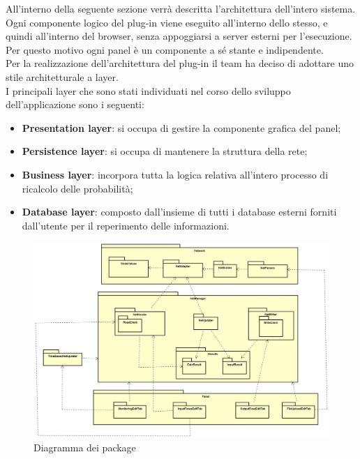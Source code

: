 \pagebreak
{}
All'interno della seguente sezione verrà descritta l'architettura dell'intero sistema.\\
Ogni componente logico del plug-in viene eseguito all'interno dello stesso, e quindi all'interno del browser, senza appoggiarsi a server esterni per l'esecuzione. Per questo motivo ogni panel è un componente a sé stante e indipendente. \\
Per la realizzazione dell'architettura del plug-in il team ha deciso di adottare uno stile architetturale a layer.\\
I principali layer che sono stati individuati nel corso dello sviluppo dell'applicazione sono i seguenti:
\begin{itemize}
	\item{\textbf{Presentation layer}: si occupa di gestire la componente grafica del panel;}
	\item{\textbf{Persistence layer}: si occupa di mantenere la struttura della rete;}
	\item{\textbf{Business layer}: incorpora tutta la logica relativa all’intero processo di ricalcolo delle probabilità;}
	\item{\textbf{Database layer}: composto dall’insieme di tutti i database esterni forniti dall’utente per il reperimento delle informazioni.}
\end{itemize}
\begin{figure} [H]
	\centerline{
	\includegraphics[scale=0.3]{Img/Diagramma_Package}}
	\caption{Diagramma dei package}\label{}
\end{figure}
